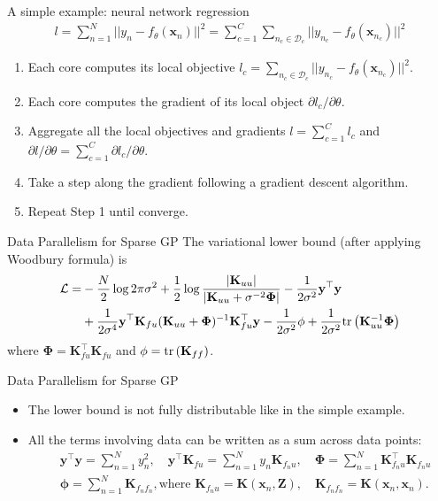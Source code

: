 \documentclass[14pt,aspectratio=1610]{beamer}
\newcommand{\yV}{\mathbf{y}}
\newcommand{\xV}{\mathbf{x}}
\newcommand{\K}{\mathbf{K}}
\newcommand{\zM}{\mathbf{Z}}
\newcommand{\bound}{\mathcal{L}}
\newcommand{\phiM}{\mathbf{\Phi}}
\newcommand{\phiV}{\mathbf{\phi}}
\begin{document}
\begin{frame}{A simple example: neural network regression}
\begin{align*}
l = \sum_{n=1}^N ||y_n - f_\theta( \xV_n )||^2 = \sum_{c=1}^C \sum_{n_c \in \mathcal{D}_c} ||y_{n_c} -  f_\theta( \xV_{n_c} )||^2
\end{align*}
\vspace{-10mm}
\begin{enumerate}
\item Each core computes its local objective $l_c = \sum_{n_c \in \mathcal{D}_c} ||y_{n_c} -  f_\theta( \xV_{n_c} )||^2$.
\item Each core computes the gradient of its local object $\partial l_c/ \partial \theta$.
\item Aggregate all the local objectives and gradients $l = \sum_{c=1}^C l_c$ and $\partial l/ \partial \theta = \sum_{c=1}^C \partial l_c/ \partial \theta$.
\item Take a step along the gradient following a gradient descent algorithm.
\item Repeat Step 1 until converge.
\end{enumerate}
\end{frame}

\begin{frame}{Data Parallelism for Sparse GP}
The variational lower bound (after applying Woodbury formula) is
\begin{align*}
\bound =& -\frac{N}{2}\log 2\pi \sigma^2 +\frac{1}{2} \log \frac{|\K_{uu}|}{|\K_{uu}+\sigma^{-2}\phiM|} -\frac{1}{2\sigma^2}\yV^\top\yV\\
&+\frac{1}{2\sigma^4}\yV^\top\K_{fu}(\K_{uu} + \phiM)^{-1}\K_{fu}^\top\yV - \frac{1}{2\sigma^2}\phiV +  \frac{1}{2\sigma^2}\tr{\K_{uu}^{-1}\phiM}
\end{align*}
where $\phiM = \K_{fu}^\top \K_{fu}$ and $\phiV = \tr{\K_{ff}}$.
\end{frame}

\begin{frame}{Data Parallelism for Sparse GP}
\begin{itemize}
\item The lower bound is not fully distributable like in the simple example.
\item All the terms involving data can be written as a sum across data points:
\begin{align*}
&\yV^\top\yV = \sum_{n=1}^N y_n^2, \quad \yV^\top\K_{fu} = \sum_{n=1}^N y_n \K_{f_n u}, \quad \phiM = \sum_{n=1}^N \K_{f_n u}^\top \K_{f_n u}\\
&\phiV = \sum_{n=1}^N\K_{f_n f_n}, \text{where } \K_{f_n u} = \K(\xV_n, \zM), \quad \K_{f_n f_n} = \K(\xV_n, \xV_n).
\end{align*}
\end{itemize}
\end{frame}
\end{document}
